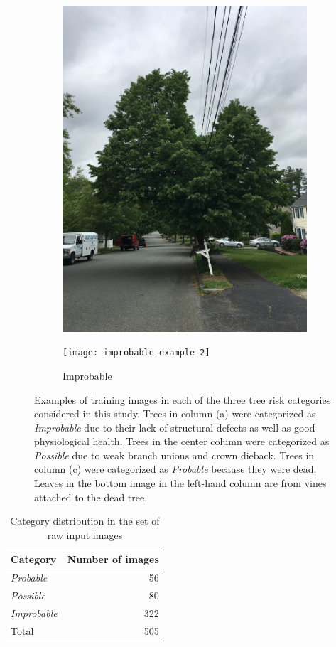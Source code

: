 \documentclass[Journal, letterpaper, DoubleSpace, InsideFigs]{ascelike-new}
\begin{document}
\begin{figure}[ht]
\begin{subfigure}[t]{.325\linewidth}
    \includegraphics[width=\textwidth,keepaspectratio=true,angle=-90]{improbable-example-1} %

    \texttt{[image: improbable-example-2]}
    \caption{Improbable}
  \end{subfigure}
  \caption{Examples of training images in each of the three tree risk categories considered in this study.  Trees in  
     column (a) were categorized as \textit{Improbable} due to their lack of structural defects as well as good
    physiological health. Trees in the center column were categorized as \textit{Possible} due to weak branch unions and crown
    dieback. Trees in column (c)  were categorized as \textit{Probable} because they were dead. Leaves in the bottom
    image in the left-hand column are from vines attached to the dead tree.}
  \label{fig:raw_images}
\end{figure}

\begin{table}[h!]\small
    \centering
    \begin{tabular}{l r}\toprule
    \bf Category     & \bf Number of images  \\ \midrule
    \textit{Probable} & 56 \\
      \textit{Possible} & 80 \\
      \textit{Improbable} & 322\\\midrule
    Total & 505 \\\bottomrule
    \end{tabular}
    \caption{Category distribution  in the set of raw input images}
    \label{tab:classdist}
\end{table}
\end{document}
